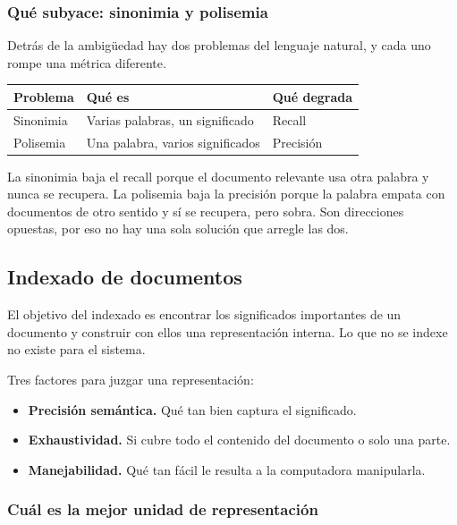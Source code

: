 \documentclass[11pt,letterpaper]{article}
\begin{document}
\subsubsection*{Qué subyace: sinonimia y polisemia}

Detrás de la ambigüedad hay dos problemas del lenguaje natural, y cada
uno rompe una métrica diferente.

\begin{center}
\begin{tabular}{lll}
    \toprule
    \textbf{Problema} & \textbf{Qué es} & \textbf{Qué degrada} \\
    \midrule
    Sinonimia & Varias palabras, un significado & Recall \\
    Polisemia & Una palabra, varios significados & Precisión \\
    \bottomrule
\end{tabular}
\end{center}

\begin{idea}
    La sinonimia baja el recall porque el documento relevante usa otra
    palabra y nunca se recupera. La polisemia baja la precisión porque
    la palabra empata con documentos de otro sentido y sí se recupera,
    pero sobra. Son direcciones opuestas, por eso no hay una sola
    solución que arregle las dos.
\end{idea}

\subsection*{Indexado de documentos}

El objetivo del indexado es encontrar los significados importantes de
un documento y construir con ellos una representación interna. Lo que
no se indexe no existe para el sistema.

Tres factores para juzgar una representación:

\begin{itemize}[itemsep=0.2em]
    \item \textbf{Precisión semántica.} Qué tan bien captura el
          significado.
    \item \textbf{Exhaustividad.} Si cubre todo el contenido del
          documento o solo una parte.
    \item \textbf{Manejabilidad.} Qué tan fácil le resulta a la
          computadora manipularla.
\end{itemize}

\subsubsection*{Cuál es la mejor unidad de representación}
\end{document}
